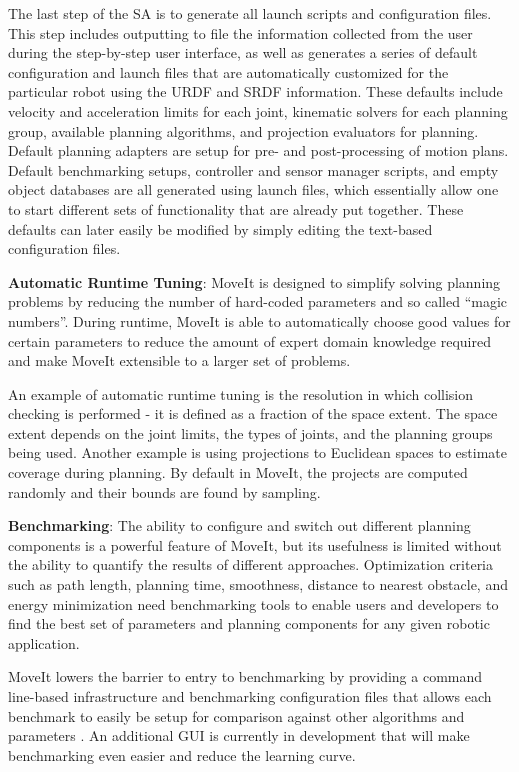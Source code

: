 \documentclass[10pt,journal,compsoc]{joser1}
\begin{document}
{The last step of the SA is to generate all launch scripts and configuration files. This step includes outputting to file the information collected from the user during the step-by-step user interface, as well as generates a series of default configuration and launch files that are automatically customized for the particular robot using the URDF and SRDF information. These defaults include velocity and acceleration limits for each joint, kinematic solvers for each planning group, available planning algorithms, and projection evaluators for planning. Default planning adapters are setup for pre- and post-processing of motion plans. Default benchmarking setups, controller and sensor manager scripts, and empty object databases are all generated using launch files, which essentially allow one to start different sets of functionality that are already put together. These defaults can later easily be modified by simply editing the text-based configuration files.

{\bf Automatic Runtime Tuning}: MoveIt is designed to simplify solving planning problems by reducing the number of hard-coded parameters and so called ``magic numbers''. During runtime, MoveIt is able to automatically choose good values for certain parameters to reduce the amount of expert domain knowledge required and make MoveIt extensible to a larger set of problems. 

An example of automatic runtime tuning is the resolution in which collision checking is performed - it is defined as a fraction of the space extent. The space extent depends on the joint limits, the types of joints, and the planning groups being used. Another example is using projections to Euclidean spaces to estimate coverage during planning. By default in MoveIt, the projects are computed randomly and their bounds are found by sampling.

{\bf Benchmarking}: The ability to configure and switch out different planning components is a powerful feature of MoveIt, but its usefulness is limited without the ability to quantify the results of different approaches. Optimization criteria such as path length, planning time, smoothness, distance to nearest obstacle, and energy minimization need benchmarking tools to enable users and developers to find the best set of parameters and planning components for any given robotic application.

MoveIt lowers the barrier to entry to benchmarking by providing a command line-based infrastructure and benchmarking configuration files that allows each benchmark to easily be setup for comparison against other algorithms and parameters \cite{cohen2012generic}. An additional GUI is currently in development that will make benchmarking even easier and reduce the learning curve.

}
\end{document}
